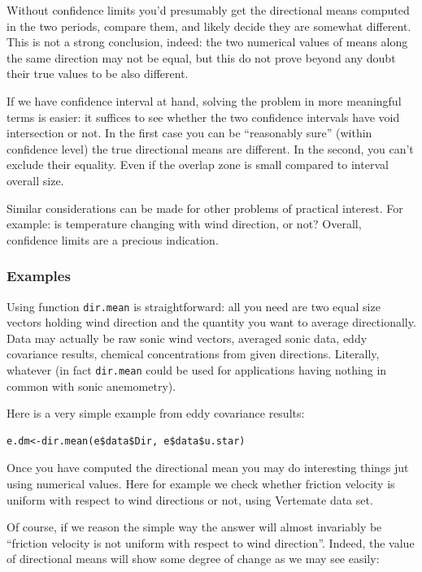\documentclass[a4paper,10pt]{book}
\begin{document}
Without confidence limits you'd presumably get the directional means computed in the two periods, compare them, and likely decide they are somewhat different. This is not a strong conclusion, indeed: the two numerical values of means along the same direction may not be equal, but this do not prove beyond any doubt their true values to be also different.

If we have confidence interval at hand, solving the problem in more meaningful terms is easier: it suffices to see whether the two confidence intervals have void intersection or not. In the first case you can be ``reasonably sure'' (within confidence level) the true directional means are different. In the second, you can't exclude their equality. Even if the overlap zone is small compared to interval overall size.

Similar considerations can be made for other problems of practical interest. For example: is temperature changing with wind direction, or not? Overall, confidence limits are a precious indication.

\subsubsection{Examples}

Using function \verb|dir.mean| is straightforward: all you need are two equal size vectors holding wind direction and the quantity you want to average directionally. Data may actually be raw sonic wind vectors, averaged sonic data, eddy covariance results, chemical concentrations from given directions. Literally, whatever (in fact \verb|dir.mean| could be used for applications having nothing in common with sonic anemometry).

Here is a very simple example from eddy covariance results:

\begin{verbatim}
e.dm<-dir.mean(e$data$Dir, e$data$u.star)
\end{verbatim}

Once you have computed the directional mean you may do interesting things jut using numerical values. Here for example we check whether friction velocity is uniform with respect to wind directions or not, using Vertemate data set.

Of course, if we reason the simple way the answer will almost invariably be ``friction velocity is not uniform with respect to wind direction''. Indeed, the value of directional means will show some degree of change as we may see easily:
\end{document}

